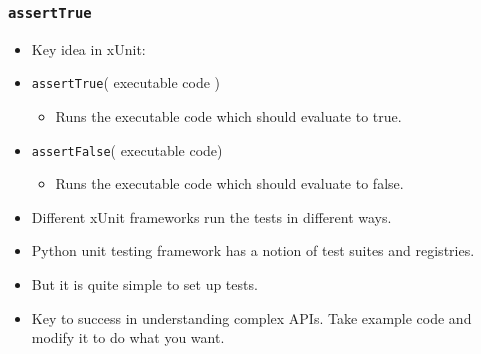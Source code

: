 \documentclass{beamer}
\begin{document}
\begin{frame}
  \frametitle{{\tt assertTrue}}
  \begin{itemize}
  \item Key idea in xUnit:
  \item {\tt assertTrue}( executable code )
    \begin{itemize}
    \item  Runs the executable code which should evaluate to true.
    \end{itemize}
  \item {\tt assertFalse}( executable code)

    \begin{itemize}
  \item Runs the executable code which should evaluate to false. 
\end{itemize}
    \end{itemize}
\end{frame}
\begin{frame}
  \begin{itemize}
  \item Different xUnit frameworks run the tests in different
  ways. 
\item Python unit testing framework has a notion of test suites and
  registries.
\item But it is quite simple to set up tests.
\item  Key to success in understanding complex APIs. Take example code
  and modify it to do what you want. 
  \end{itemize}
\end{frame}
\end{document}
